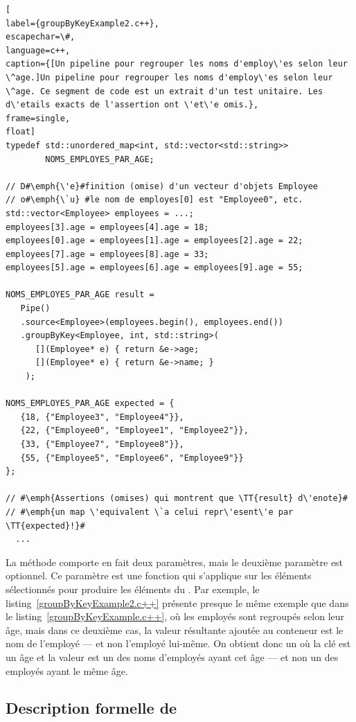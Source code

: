 \begin{lstlisting}[
label={groupByKeyExample2.c++},
escapechar=\#,
language=c++,
caption={[Un pipeline pour regrouper les noms d'employ\'es selon leur \^age.]Un pipeline pour regrouper les noms d'employ\'es selon leur \^age. Ce segment de code est un extrait d'un test unitaire. Les d\'etails exacts de l'assertion ont \'et\'e omis.},
frame=single,
float]
typedef std::unordered_map<int, std::vector<std::string>> 
        NOMS_EMPLOYES_PAR_AGE;

// D#\emph{\'e}#finition (omise) d'un vecteur d'objets Employee 
// o#\emph{\`u} #le nom de employes[0] est "Employee0", etc.
std::vector<Employee> employees = ...; 
employees[3].age = employees[4].age = 18;
employees[0].age = employees[1].age = employees[2].age = 22;
employees[7].age = employees[8].age = 33;
employees[5].age = employees[6].age = employees[9].age = 55;

NOMS_EMPLOYES_PAR_AGE result = 
   Pipe()
   .source<Employee>(employees.begin(), employees.end())
   .groupByKey<Employee, int, std::string>(
      [](Employee* e) { return &e->age; 
      [](Employee* e) { return &e->name; }
    );
    
NOMS_EMPLOYES_PAR_AGE expected = {
   {18, {"Employee3", "Employee4"}},
   {22, {"Employee0", "Employee1", "Employee2"}},
   {33, {"Employee7", "Employee8"}},
   {55, {"Employee5", "Employee6", "Employee9"}}
};

// #\emph{Assertions (omises) qui montrent que \TT{result} d\'enote}#
// #\emph{un map \'equivalent \`a celui repr\'esent\'e par \TT{expected}!}#
  ...
\end{lstlisting}


La m\'ethode  comporte en fait deux param\`etres, mais le deuxi\`eme param\`etre est optionnel. Ce param\`etre est une fonction qui s'applique sur les \'el\'ements s\'electionn\'es pour produire les \'el\'ements du . Par exemple,  le listing~\ref{groupByKeyExample2.c++} pr\'esente presque le m\^eme exemple que dans le listing~\ref{groupByKeyExample.c++}, o\`u les employ\'es sont regroup\'es selon leur \^age, mais dans ce deuxi\`eme cas, la valeur r\'esultante ajout\'ee au conteneur est le nom de l'employ\'e --- et non l'employ\'e lui-m\^eme. On obtient donc un  o\`u la cl\'e est un \^age et la valeur est un  des noms d'employ\'es ayant cet \^age --- et non un  des employ\'es ayant le m\^eme \^age.


\subsection*{Description formelle de }

